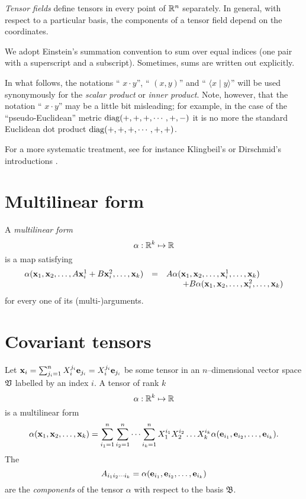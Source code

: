 {\em Tensor fields} define tensors in every point of ${\Bbb R}^n$ separately.
In general, with respect to a particular basis, the components of a tensor field
depend on the coordinates.


We adopt Einstein's summation convention to sum over equal indices
(one pair with a superscript and a subscript).
Sometimes, sums are written out explicitly.


In what follows, the notations
`` $x\cdot y$'',
`` $(x,y)$'' and
`` $\langle x\mid y\rangle $'' will be used synonymously for the {\em
scalar product}
or
{\em inner product}.
Note, however, that the notation `` $x\cdot y$''
may be a little bit misleading; for example, in the case of the ``pseudo-Euclidean'' metric
 ${\rm diag}(+,+,+,\cdots ,+,-)$ it is no more the standard Euclidean dot product
${\rm diag}(+,+,+,\cdots ,+,+)$.

For a more systematic treatment, see for instance Klingbeil's
or Dirschmid's introductions
\cite{Klingbeil,Dirschmid}.


\section{Multilinear form}

A {\em multilinear form}
\begin{equation}
\alpha :{\Bbb R}^k \mapsto {\Bbb R}
\end{equation}
is a map satisfying
\begin{equation}
\begin{array}{rcl}
\alpha ( {\bf x}_1,{\bf x}_2,\ldots , A {\bf x}^1_i+ B {\bf x}^2_i,\ldots ,{\bf x}_k)
&=&
A\alpha ( {\bf x}_1,{\bf x}_2,\ldots , {\bf x}^1_i,\ldots ,{\bf x}_k) \nonumber \\
&&  \qquad +
B\alpha ( {\bf x}_1,{\bf x}_2,\ldots , {\bf x}^2_i,\ldots ,{\bf x}_k)
\end{array}
\end{equation}
for every one of its (multi-)arguments.


\section{Covariant tensors}
Let  ${\bf x}_i =\sum_{j_i=1}^n X^{j_i}_i {\bf e}_{j_i} =X^{j_i}_i {\bf e}_{j_i}$ be some tensor in an $n$--dimensional vector space ${\frak V}$ labelled by an index $i$.
A tensor of rank $k$
\begin{equation}
\alpha:{\Bbb R}^k \mapsto {\Bbb R}
\end{equation}
is a multilinear form
\begin{equation}
\alpha ( {\bf x}_1,{\bf x}_2,\ldots ,{\bf x}_k)=
\sum_{i_1=1}^n
\sum_{i_2=1}^n
\cdots
\sum_{i_k=1}^n
X^{i_1}_1 X^{i_2}_2\ldots X^{i_k}_k
\alpha ( {\bf e}_{i_1},{\bf e}_{i_2},\ldots ,{\bf e}_{i_k}).
\end{equation}
The
\begin{equation}
A_{{i_1}{i_2}\cdots {i_k}}=\alpha ( {\bf e}_{i_1},{\bf e}_{i_2},\ldots ,{\bf e}_{i_k})
\end{equation}
 are the
{\em components} of the tensor $\alpha $ with respect to the basis
${\mathfrak B}$.

